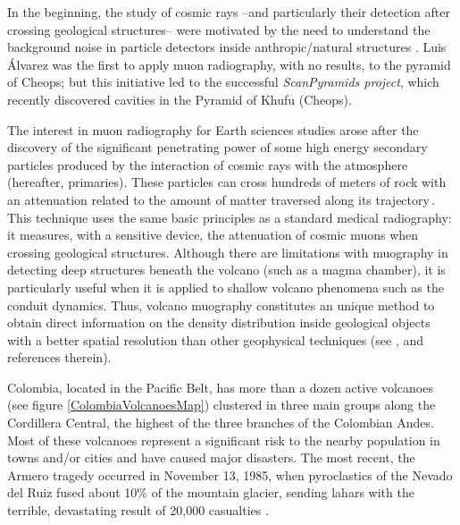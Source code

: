 \documentclass[letterpaper,10pt,titlepage,linenumber]{article}
\begin{document}
In the beginning, the study of cosmic rays --and particularly their detection after crossing geological structures-- were motivated by the need to understand the background noise in particle detectors inside anthropic/natural structures \cite{George1955,ZichichiEtal2000}. Luis \'Alvarez \cite{AlvarezEtal1970} was the first to apply muon radiography, with no results, to the pyramid of Cheops; but this initiative led to the successful \textit{ScanPyramids project}, which recently discovered cavities in the Pyramid of Khufu (Cheops)\cite{MorishimaEtal2017}. 

The interest in muon radiography for Earth sciences studies arose after the discovery of the significant penetrating power of some high energy secondary particles produced by the interaction of cosmic rays with the atmosphere (hereafter, primaries). These particles can cross hundreds of meters of rock with an attenuation related to the amount of matter traversed along its trajectory\,\cite{Nagamine2003}. This technique uses the same basic principles as a standard medical radiography: it measures, with a sensitive device, the attenuation of cosmic muons when crossing geological structures. Although there are limitations with muography in detecting deep structures beneath the volcano (such as a magma chamber), it is particularly useful when it is applied to shallow volcano phenomena such as the conduit dynamics. Thus, volcano muography constitutes an unique method to obtain direct information on the density distribution inside geological objects with a better spatial resolution than other geophysical techniques (see \cite{ThompsonEtal2019,Kaiser2019,TanakaOlah2019, CarboneEtal2014,JourdeEtal2013, Tanaka2013, Tanaka2016, CarloganuEtal2013, PortalEtal2013, MarteauEtal2012, Okubo2012, LesparreEtal2010, TanakaEtal2007},  and references therein). 

Colombia, located in the Pacific Belt, has more than a dozen active volcanoes (see figure \ref{ColombiaVolcanoesMap})  clustered in three main groups along the Cordillera Central, the highest of the three branches of the Colombian Andes.  Most of these volcanoes represent a significant risk to the nearby population in towns and/or cities\cite{Cortes2016,Agudelo2016,Munoz2017} and have caused major disasters. The most recent, the Armero tragedy occurred in November 13, 1985, when pyroclastics of the Nevado del Ruiz  fused about 10\% of the mountain glacier, sending  lahars with the terrible, devastating result of 20,000 casualties \cite{PiersonEtal1990}.
\end{document}
